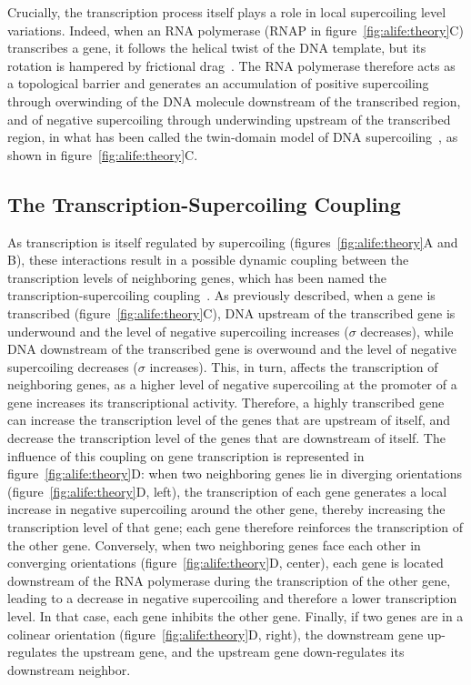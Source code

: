 Crucially, the transcription process itself plays a role in local supercoiling level variations.
Indeed, when an RNA polymerase (RNAP in figure~\ref{fig:alife:theory}C) transcribes a gene, it follows the helical twist of the DNA template, but its rotation is hampered by frictional drag~\citep{ma2016}.
The RNA polymerase therefore acts as a topological barrier and generates an accumulation of positive supercoiling through overwinding of the DNA molecule downstream of the transcribed region, and of negative supercoiling through underwinding upstream of the transcribed region, in what has been called the twin-domain model of DNA supercoiling~\citep{liu1987}, as shown in figure~\ref{fig:alife:theory}C.


\subsection{The Transcription-Supercoiling Coupling}

As transcription is itself regulated by supercoiling (figures~\ref{fig:alife:theory}A and B), these interactions result in a possible dynamic coupling between the transcription levels of neighboring genes, which has been named the transcription-supercoiling coupling~\citep{martisb.2019}.
As previously described, when a gene is transcribed (figure~\ref{fig:alife:theory}C), DNA upstream of the transcribed gene is underwound and the level of negative supercoiling increases ($\sigma$ decreases), while DNA downstream of the transcribed gene is overwound and the level of negative supercoiling decreases ($\sigma$ increases).
This, in turn, affects the transcription of neighboring genes, as a higher level of negative supercoiling at the promoter of a gene increases its transcriptional activity.
Therefore, a highly transcribed gene can increase the transcription level of the genes that are upstream of itself, and decrease the transcription level of the genes that are downstream of itself.
The influence of this coupling on gene transcription is represented in figure~\ref{fig:alife:theory}D: when two neighboring genes lie in diverging orientations (figure~\ref{fig:alife:theory}D, left), the transcription of each gene generates a local increase in negative supercoiling around the other gene, thereby increasing the transcription level of that gene; each gene therefore reinforces the transcription of the other gene.
Conversely, when two neighboring genes face each other in converging orientations (figure~\ref{fig:alife:theory}D, center), each gene is located downstream of the RNA polymerase during the transcription  of the other gene, leading to a decrease in negative supercoiling and therefore a lower transcription level. In that case, each gene inhibits the other gene.
Finally, if two genes are in a colinear orientation (figure~\ref{fig:alife:theory}D, right), the downstream gene up-regulates the upstream gene, and the upstream gene down-regulates its downstream neighbor.

